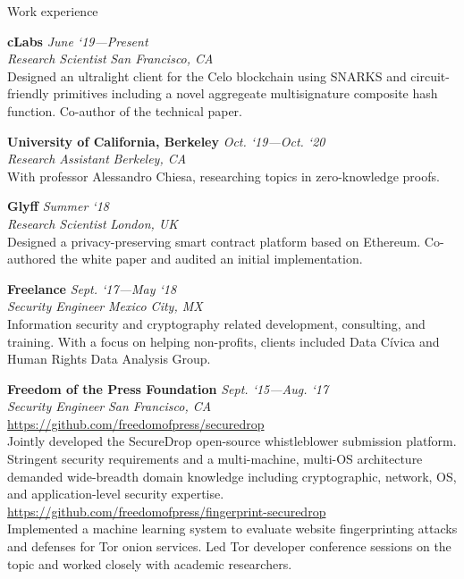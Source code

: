 \documentclass{cv}
\begin{document}
\begin{rSection}{Work experience}


\textbf{cLabs} \hfill \emph{June `19---Present} \\
\emph{Research Scientist} \hfill \emph{San Francisco, CA} \\
{\small Designed an ultralight client for the Celo blockchain using SNARKS and circuit-friendly primitives including a novel aggregeate multisignature
composite hash function. Co-author of the technical paper.}

\textbf{University of California, Berkeley} \hfill \emph{Oct. `19---Oct. `20} \\
\emph{Research Assistant} \hfill \emph{Berkeley, CA} \\
{\small With professor Alessandro Chiesa, researching topics in zero-knowledge proofs.}

\textbf{Glyff} \hfill \emph{Summer `18} \\
\emph{Research Scientist} \hfill \emph{London, UK} \\
{\small Designed a privacy-preserving smart contract platform based on Ethereum. Co-authored the white paper and audited an initial implementation.}

\textbf{Freelance} \hfill \emph{Sept. `17---May `18} \\
\emph{Security Engineer} \hfill \emph{Mexico City, MX} \\
{\small Information security and cryptography related development, consulting, and training. With a focus on helping non-profits, clients included Data Cívica and Human Rights Data Analysis Group.}

\textbf{Freedom of the Press Foundation} \hfill \emph{Sept. `15---Aug. `17} \\
\emph{Security Engineer} \hfill \emph{San Francisco, CA} \\
\url{https://github.com/freedomofpress/securedrop} \\
{\small Jointly developed the SecureDrop open-source whistleblower submission platform. Stringent security requirements and a multi-machine, multi-OS architecture demanded wide-breadth domain knowledge including cryptographic, network, OS, and application-level security expertise.} \\
\url{https://github.com/freedomofpress/fingerprint-securedrop} \\
{\small Implemented a machine learning system to evaluate website fingerprinting attacks and defenses for Tor onion services. Led Tor developer conference sessions on the topic and worked closely with academic researchers.}

\end{rSection}
\end{document}
